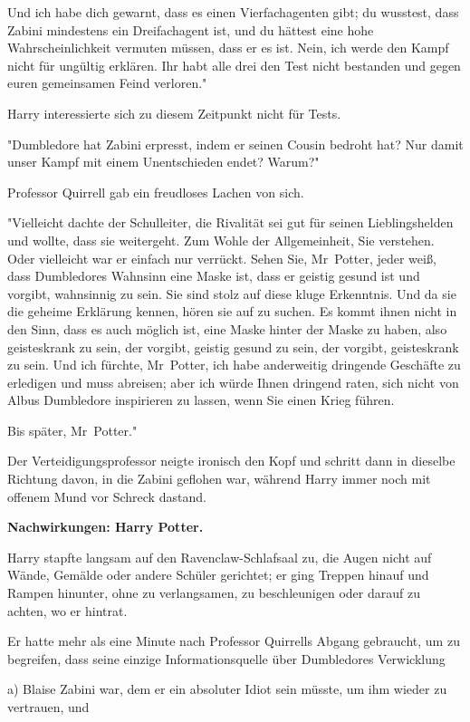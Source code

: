 {Und ich habe dich gewarnt, dass es einen Vierfachagenten gibt; du wusstest, dass Zabini mindestens ein Dreifachagent ist, und du hättest eine hohe Wahrscheinlichkeit vermuten müssen, dass er es ist. Nein, ich werde den Kampf nicht für ungültig erklären. Ihr habt alle drei den Test nicht bestanden und gegen euren gemeinsamen Feind verloren."

Harry interessierte sich zu diesem Zeitpunkt nicht für Tests.

"Dumbledore hat Zabini erpresst, indem er seinen Cousin bedroht hat? Nur damit unser Kampf mit einem Unentschieden endet? Warum?"

Professor Quirrell gab ein freudloses Lachen von sich.

"Vielleicht dachte der Schulleiter, die Rivalität sei gut für seinen Lieblingshelden und wollte, dass sie weitergeht. Zum Wohle der Allgemeinheit, Sie verstehen. Oder vielleicht war er einfach nur verrückt. Sehen Sie, Mr~Potter, jeder weiß, dass Dumbledores Wahnsinn eine Maske ist, dass er geistig gesund ist und vorgibt, wahnsinnig zu sein. Sie sind stolz auf diese kluge Erkenntnis. Und da sie die geheime Erklärung kennen, hören sie auf zu suchen. Es kommt ihnen nicht in den Sinn, dass es auch möglich ist, eine Maske hinter der Maske zu haben, also geisteskrank zu sein, der vorgibt, geistig gesund zu sein, der vorgibt, geisteskrank zu sein. Und ich fürchte, Mr~Potter, ich habe anderweitig dringende Geschäfte zu erledigen und muss abreisen; aber ich würde Ihnen dringend raten, sich nicht von Albus Dumbledore inspirieren zu lassen, wenn Sie einen Krieg führen.

Bis später, Mr~Potter."

Der Verteidigungsprofessor neigte ironisch den Kopf und schritt dann in dieselbe Richtung davon, in die Zabini geflohen war, während Harry immer noch mit offenem Mund vor Schreck dastand.

\textbf{Nachwirkungen: Harry Potter.}

Harry stapfte langsam auf den Ravenclaw-Schlafsaal zu, die Augen nicht auf Wände, Gemälde oder andere Schüler gerichtet; er ging Treppen hinauf und Rampen hinunter, ohne zu verlangsamen, zu beschleunigen oder darauf zu achten, wo er hintrat.

Er hatte mehr als eine Minute nach Professor Quirrells Abgang gebraucht, um zu begreifen, dass seine einzige Informationsquelle über Dumbledores Verwicklung

a) Blaise Zabini war, dem er ein absoluter Idiot sein müsste, um ihm wieder zu vertrauen, und

}
